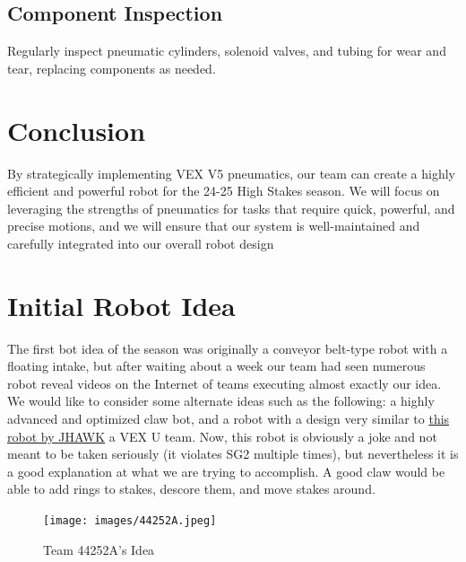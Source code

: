 \subsection*{Component Inspection}
Regularly inspect pneumatic cylinders, solenoid valves, and tubing for wear and tear, replacing components as needed.

\section*{Conclusion}
By strategically implementing VEX V5 pneumatics, our team can create a highly efficient and powerful robot for the 24-25 High Stakes season. We will focus on leveraging the strengths of pneumatics for tasks that require quick, powerful, and precise motions, and we will ensure that our system is well-maintained and carefully integrated into our overall robot design
\label{Initial-Robot-Idea}
\section*{Initial Robot Idea}
The first bot idea of the season was originally a conveyor belt-type robot with a floating intake, but after waiting about a week our team had seen numerous robot reveal videos on the Internet of teams executing almost exactly our idea.  We would like to consider some alternate ideas such as the following: a highly advanced and optimized claw bot, and a robot with a design very similar to \href{https://www.youtube.com/watch?v=HGlivnB0J8U}{this robot by JHAWK} a VEX U team. Now, this robot is obviously a joke and not meant to be taken seriously (it violates SG2 multiple times), but nevertheless it is a good explanation at what we are trying to accomplish. A good claw would be able to add rings to stakes, descore them, and move stakes around. 
\begin{figure}
    \centering
    \texttt{[image: images/44252A.jpeg]}
    \caption{Team 44252A's Idea}
    \label{fig:44252A}
\end{figure}
